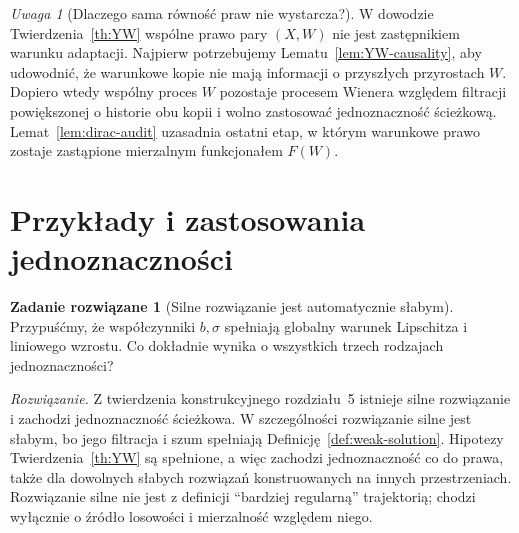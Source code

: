 \documentclass[11pt,a4paper,oneside]{report}
\numberwithin{equation}{chapter}
\theoremstyle{plain}
\theoremstyle{definition}
\newtheorem{zadanie}{Zadanie rozwiązane}[chapter]
\theoremstyle{remark}
\newtheorem{uwaga}{Uwaga}[chapter]
\begin{document}
\begin{uwaga}[Dlaczego sama równość praw nie wystarcza?]
W dowodzie Twierdzenia~\ref{th:YW} wspólne prawo pary
$(X,W)$ nie jest zastępnikiem warunku adaptacji.
Najpierw potrzebujemy Lematu~\ref{lem:YW-causality}, aby
udowodnić, że warunkowe kopie nie mają informacji o
przyszłych przyrostach $W$. Dopiero wtedy wspólny proces
$W$ pozostaje procesem Wienera względem filtracji
powiększonej o historie obu kopii i wolno zastosować
jednoznaczność ścieżkową. Lemat~\ref{lem:dirac-audit}
uzasadnia ostatni etap, w którym warunkowe prawo
zostaje zastąpione mierzalnym funkcjonałem $F(W)$.
\end{uwaga}

\section{Przykłady i zastosowania jednoznaczności}\label{sec:volIII:14:05}

\begin{zadanie}[Silne rozwiązanie jest automatycznie słabym]
Przypuśćmy, że współczynniki $b,\sigma$ spełniają
globalny warunek Lipschitza i liniowego wzrostu.
Co dokładnie wynika o wszystkich trzech rodzajach
jednoznaczności?

\emph{Rozwiązanie.} Z twierdzenia konstrukcyjnego
rozdziału~5 istnieje silne rozwiązanie i zachodzi
jednoznaczność ścieżkowa. W szczególności rozwiązanie
silne jest słabym, bo jego filtracja i szum spełniają
Definicję~\ref{def:weak-solution}. Hipotezy
Twierdzenia~\ref{th:YW} są spełnione, a więc zachodzi
jednoznaczność co do prawa, także dla dowolnych słabych
rozwiązań konstruowanych na innych przestrzeniach.
Rozwiązanie silne nie jest z definicji ``bardziej
regularną'' trajektorią; chodzi wyłącznie o źródło
losowości i mierzalność względem niego.
\end{zadanie}
\end{document}
